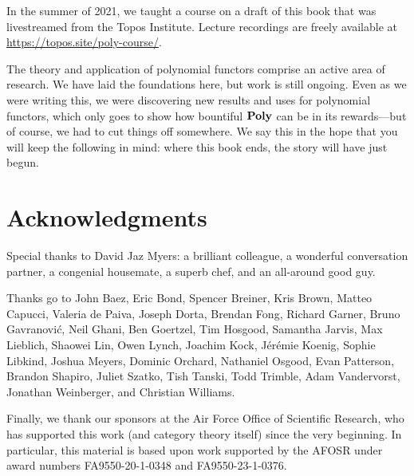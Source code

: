 \documentclass[Book-Poly]{subfiles}
\begin{document}
In the summer of 2021, we taught a course on a draft of this book that was livestreamed from the Topos Institute.
Lecture recordings are freely available at \url{https://topos.site/poly-course/}.

The theory and application of polynomial functors comprise an active area of research.
We have laid the foundations here, but work is still ongoing.
Even as we were writing this, we were discovering new results and uses for polynomial functors, which only goes to show how bountiful $\mathbf{Poly}$ can be in its rewards---but of course, we had to cut things off somewhere.
We say this in the hope that you will keep the following in mind: where this book ends, the story will have just begun.

\section*{Acknowledgments}

Special thanks to David Jaz Myers: a brilliant colleague, a wonderful conversation partner, a congenial housemate, a superb chef, and an all-around good guy.

Thanks go to John Baez, Eric Bond, Spencer Breiner, Kris Brown, Matteo Capucci, Valeria de Paiva, Joseph Dorta, Brendan Fong, Richard Garner, Bruno Gavranovi\'c, Neil Ghani, Ben Goertzel, Tim Hosgood, Samantha Jarvis, Max Lieblich, Shaowei Lin, Owen Lynch, Joachim Kock, J\'er\'emie Koenig, Sophie Libkind, Joshua Meyers, Dominic Orchard, Nathaniel Osgood, Evan Patterson, Brandon Shapiro, Juliet Szatko, Tish Tanski, Todd Trimble, Adam Vandervorst, Jonathan Weinberger, and Christian Williams.

Finally, we thank our sponsors at the Air Force Office of Scientific Research, who has supported this work (and category theory itself) since the very beginning. In particular, this material is based upon work supported by the AFOSR under award numbers FA9550-20-1-0348 and FA9550-23-1-0376. 
\end{document}
